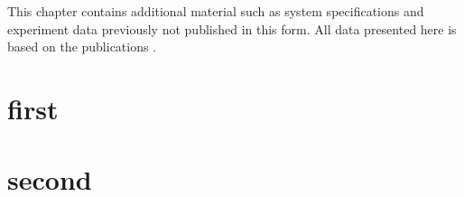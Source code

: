 This chapter contains additional material such as system specifications and experiment data previously not published in this form.
All data presented here is based on the publications \AppACites.


\section{first}


\section{second}




